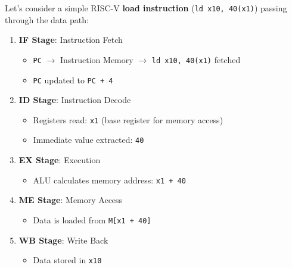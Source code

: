 \begin{examplebox}
    Let's consider a simple RISC-V \textbf{load instruction} (\texttt{ld x10, 40(x1)}) passing through the data path:
    \begin{enumerate}
        \item \textbf{IF Stage}: Instruction Fetch
        \begin{itemize}
            \item \texttt{PC} $\rightarrow$ Instruction Memory $\rightarrow$ \texttt{ld x10, 40(x1)} fetched
            \item \texttt{PC} updated to \texttt{PC + 4}
        \end{itemize}

        \item \textbf{ID Stage}: Instruction Decode
        \begin{itemize}
            \item Registers read: \texttt{x1} (base register for memory access)
            \item Immediate value extracted: \texttt{40}
        \end{itemize}

        \item \textbf{EX Stage}: Execution
        \begin{itemize}
            \item ALU calculates memory address: \texttt{x1 + 40}
        \end{itemize}

        \item \textbf{ME Stage}: Memory Access
        \begin{itemize}
            \item Data is loaded from \texttt{M[x1 + 40]}
        \end{itemize}

        \item \textbf{WB Stage}: Write Back
        \begin{itemize}
            \item Data stored in \texttt{x10}
        \end{itemize}
    \end{enumerate}
\end{examplebox}
